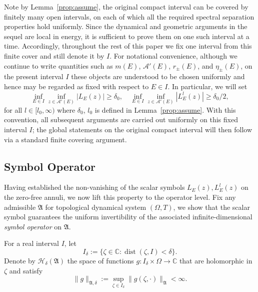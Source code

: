 \documentclass[reqno,11pt]{amsart}
\begin{document}
Note by Lemma~\ref{prop:assume}, the original compact interval can be covered by finitely many open intervals, on each of which all the required spectral separation properties hold uniformly. Since the dynamical and geometric arguments in the sequel are local in energy, it is sufficient to prove them on one such interval at a time. 
Accordingly, throughout the rest of this paper we fix one interval from this finite cover and still denote it by $I$. For notational convenience, although we continue to write quantities such as $m(E)$, $\mathcal A'(E)$, $r_\pm(E)$, and $\eta_\pm(E)$, on the present interval $I$ these objects are understood to be chosen uniformly and hence may be regarded as fixed with respect to $E\in I$. In particular, we will set 
\begin{equation}\label{delta0}
 \inf_{E\in I}\inf_{z\in \mathcal A'(E)}|L_{E}^{}(z)|\ge \delta_0, \quad\inf_{E\in I}\inf_{z\in \mathcal A'(E)}|L_{E}^{l}(z)|\ge \delta_0/2,
\end{equation}
for all $l\in[l_0,\infty)$ where $\delta_0$, $l_0$ is defined in Lemma~\ref{prop:assume}.
 With this convention, all subsequent arguments are carried out uniformly on this fixed interval $I$; the global statements on the original compact interval will then follow via a standard finite covering argument. 


\subsection{Symbol Operator}




Having established the non-vanishing of the scalar symbols $L_E^{}(z), L_E^{l}(z)$ on the zero-free annuli, we now lift this property to the operator level.
Fix any admissible $\mathfrak A$ for topological dynamical system 
$(\Omega,T)$, we show that the scalar symbol guarantees the uniform invertibility of the associated infinite-dimensional  \textit{symbol operator} on
$\mathfrak A$.


For a real interval $I$, let
\begin{equation}\label{complexneig}
I_\delta:=
\{\zeta\in\mathbb C:\operatorname{dist}(\zeta,I)<\delta\}.
\end{equation}
Denote by $\mathcal H_\delta(\mathfrak A)$ the space of functions
$g:I_\delta\times\Omega\to\mathbb C$ that are holomorphic in $\zeta$ and satisfy
\begin{equation}\label{xdeltanorm}
\|g\|_{\mathfrak A,\delta}
:=\sup_{\zeta\in I_\delta}\|g(\zeta,\cdot)\|_{\mathfrak A}<\infty.
\end{equation}
\end{document}

